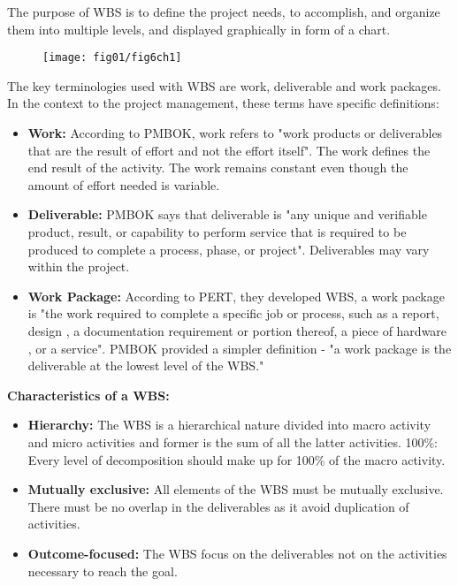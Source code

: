 The purpose of WBS \cite{WBSs} is to define the project needs, to accomplish, and organize them into multiple levels, and displayed graphically in form of a chart.

 \begin{figure}
	\centering
	\texttt{[image: fig01/fig6ch1]}
\end{figure}
 
The key terminologies used with WBS are work, deliverable and work packages. In the context to the project management, these terms have specific definitions:
\begin{itemize}
    \item \textbf{Work:} According to PMBOK, work refers to "work products or deliverables that are the result of effort and not the effort itself". The work defines the end result of the activity. The work remains constant even though the amount of effort needed is variable.
    \item \textbf{Deliverable:} PMBOK \cite{projectvar} says that deliverable is "any unique and verifiable product, result, or capability to perform service that is required to be produced to complete a process, phase, or project". Deliverables may vary within the project.
    \item \textbf{Work Package:} According to PERT, they developed WBS, a work package is  "the work required to complete a specific job or process, such as a report, design , a documentation requirement or portion thereof, a piece of hardware , or a service". PMBOK provided a simpler definition - "a work package is the deliverable at the lowest level of the WBS."
\end{itemize}

\textbf{Characteristics of a WBS:}

\begin{itemize}
    \item \textbf{Hierarchy:} The WBS is a hierarchical nature divided into macro activity and micro activities and former is the sum of all the latter activities.
100\%: Every level of decomposition should make up for 100\% of the macro activity.
    \item \textbf{Mutually exclusive:} All elements of the WBS must be mutually exclusive. There must be no overlap in the deliverables as it avoid duplication of activities.
    \item \textbf{Outcome-focused:}  The WBS focus on the deliverables not on the activities necessary to reach the goal.
\end{itemize}

